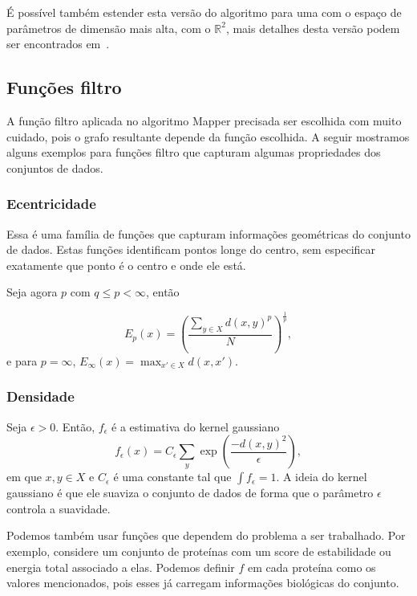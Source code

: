 É possível também estender esta versão do algoritmo para uma com o espaço de parâmetros de dimensão
mais alta, com o $\mathbb{R}^2$, mais detalhes desta versão podem ser encontrados em~\cite{mapper}.

\subsection{Funções filtro}

A função filtro aplicada no algoritmo Mapper precisada ser escolhida com muito cuidado, pois o
grafo resultante depende da função escolhida. A seguir mostramos alguns exemplos para funções
filtro que capturam algumas propriedades dos conjuntos de dados.

\subsubsection{Ecentricidade}

Essa é uma família de funções que capturam informações geométricas do conjunto de dados. Estas funções
identificam pontos longe do centro, sem especificar exatamente que ponto é o centro e onde ele está. 

Seja agora $p$ com $q \leq p < \infty$, então

\begin{equation}
    E_p(x) = \left( \frac{\sum_{y\in X} d(x,y)^p}{N} \right)^{\frac{1}{p}},
\end{equation}
e para $p = \infty$, $E_\infty(x) = \max_{x' \in X} d(x,x')$. 

\subsubsection{Densidade} 

Seja $\epsilon > 0$. Então, $f_\epsilon$ é a estimativa do kernel gaussiano  
\begin{equation}
    f_\epsilon (x) = C_\epsilon \sum_y \exp\left( \frac{-d(x,y)^2}{\epsilon}\right),
\end{equation}
em que $x,y \in X$ e $C_\epsilon$ é uma constante tal que $\int f_\epsilon = 1$. A ideia 
do kernel gaussiano é que ele suaviza o conjunto de dados de forma que o parâmetro $\epsilon$ 
controla a suavidade. 

Podemos também usar funções que dependem do problema a ser trabalhado. Por exemplo, considere
um conjunto de proteínas com um score de estabilidade ou energia total associado a elas. Podemos
definir $f$ em cada proteína como os valores mencionados, pois esses já carregam informações
biológicas do conjunto. 

